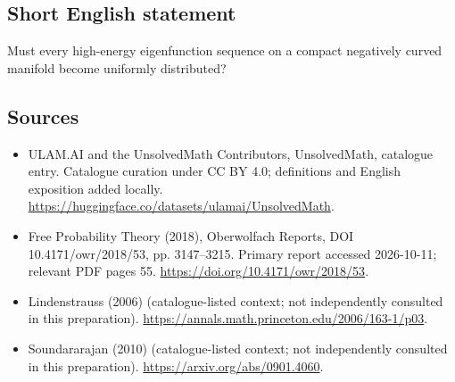 \documentclass[11pt]{article}
\begin{document}
\subsection{Short English statement}
Must every high-energy eigenfunction sequence on a compact negatively curved manifold become uniformly distributed?
\subsection{Sources}
\begin{itemize}
\item[\hypertarget{source:statement:1}{S1}] ULAM.AI and the UnsolvedMath Contributors, UnsolvedMath, catalogue entry. Catalogue curation under CC BY 4.0; definitions and English exposition added locally.
\url{https://huggingface.co/datasets/ulamai/UnsolvedMath}.
\item[\hypertarget{source:statement:2}{S2}] Free Probability Theory (2018), Oberwolfach Reports, DOI 10.4171/owr/2018/53, pp. 3147--3215. Primary report accessed 2026-10-11; relevant PDF pages 55.
\url{https://doi.org/10.4171/owr/2018/53}.
\item[\hypertarget{source:statement:3}{S3}] Lindenstrauss (2006) (catalogue-listed context; not independently consulted in this preparation).
\url{https://annals.math.princeton.edu/2006/163-1/p03}.
\item[\hypertarget{source:statement:4}{S4}] Soundararajan (2010) (catalogue-listed context; not independently consulted in this preparation).
\url{https://arxiv.org/abs/0901.4060}.
\end{itemize}
\label{end:statement}
\end{document}
